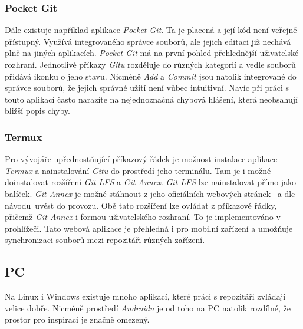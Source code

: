         \subsubsection{Pocket Git~}
        Dále existuje například aplikace \emph{Pocket Git}. Ta je placená a její kód není veřejně přístupný. Využívá integrovaného správce souborů, ale jejich editaci již nechává plně na jiných aplikacích. \emph{Pocket Git} má na první pohled přehlednější uživatelské rozhraní. Jednotlivé příkazy \emph{Gitu} rozděluje do různých kategorií a vedle souborů přidává ikonku o jeho stavu. Nicméně \emph{Add} a \emph{Commit} jsou natolik integrované do správce souborů, že jejich správné užití není vůbec intuitivní. Navíc při práci s touto aplikací často narazíte na nejednoznačná chybová hlášení, která neobsahují bližší popis chyby.

        \subsubsection{Termux~}
        Pro vývojáře upřednostňující příkazový řádek je možnost instalace aplikace \emph{Termux} a nainstalování \emph{Gitu} do prostředí jeho terminálu. Tam je i možné doinstalovat rozšíření \emph{Git LFS} a \emph{Git Annex}. \emph{Git LFS} lze nainstalovat přímo jako balíček. \emph{Git Annex} je možné stáhnout z jeho oficiálních webových stránek~ a dle návodu~uvést do provozu. Obě tato rozšíření lze ovládat z příkazové řádky, přičemž \emph{Git Annex} i formou uživatelského rozhraní. To je implementováno v prohlížeči. Tato webová aplikace je přehledná i pro mobilní zařízení a umožňuje synchronizaci souborů mezi repozitáři různých zařízení.

    \subsection {PC}
    Na Linux i Windows existuje mnoho aplikací, které práci s repozitáři zvládají velice dobře. Nicméně prostředí \emph{Androidu} je od toho na PC natolik rozdílné, že prostor pro inspiraci je značně omezený.

